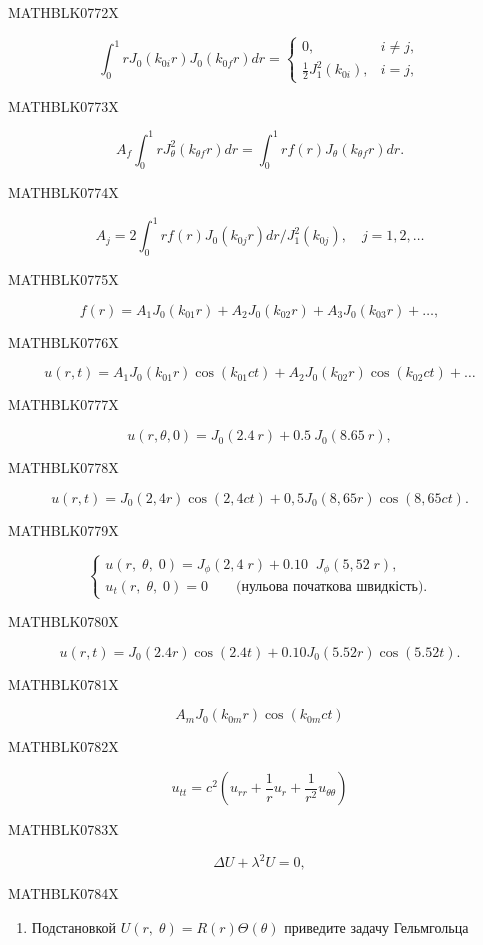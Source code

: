 \documentclass[
  ukrainian,
]{article}
\providecommand{\tightlist}{%
  \setlength{\itemsep}{0pt}\setlength{\parskip}{0pt}}
\begin{document}
MATHBLK0772X

\[
\int_{0}^{1} r J_{0}(k_{0i}r) J_{0}(k_{0f}r) dr = \begin{cases} 0, & i \neq j, \\ \frac{1}{2} J_{1}^{2}(k_{0i}), & i = j, \end{cases}
\]

MATHBLK0773X

\[
A_{f}\int_{0}^{1}rJ_{\theta}^{2}(k_{\theta f}r)dr=\int_{0}^{1}rf(r)J_{\theta}(k_{\theta f}r)dr.
\]

MATHBLK0774X

\[
A_{j} = 2 \int_{0}^{1} r f(r) J_{0}(k_{0j}r) dr / J_{1}^{2}(k_{0j}), \quad j = 1, 2, \dots
\]

MATHBLK0775X

\[
f(r) = A_1 J_0(k_{01}r) + A_2 J_0(k_{02}r) + A_3 J_0(k_{03}r) + \dots,
\]

MATHBLK0776X

\[
u(r, t) = A_1 J_0(k_{01}r) \cos(k_{01}ct) + A_2 J_0(k_{02}r) \cos(k_{02}ct) + \dots
\]

MATHBLK0777X

\[
u(r, \theta, 0) = J_0(2.4 \ r) + 0.5 \ J_0(8.65 \ r),
\]

MATHBLK0778X

\[
u(r, t) = J_0(2, 4 r) \cos(2, 4 ct) + 0,5 J_0(8,65 r) \cos(8,65 ct).
\]

MATHBLK0779X

\[
\begin{cases} u\left(r,\;\theta,\; 0\right) = J_{\phi}\left(2,4\; r\right) + 0.10\;\; J_{\phi}\left(5,52\; r\right),\\ u_{t}\left(r,\;\theta,\; 0\right) = 0 \qquad \text{(нульова початкова швидкість)}. \end{cases}
\]

MATHBLK0780X

\[
u(r, t) = J_0(2.4 r) \cos(2.4 t) + 0.10 J_0(5.52 r) \cos(5.52 t).
\]

MATHBLK0781X

\[
A_m J_0(k_{0m}r)\cos(k_{0m}ct)
\]

MATHBLK0782X

\[
u_{tt} = c^2 \left( u_{rr} + \frac{1}{r} u_r + \frac{1}{r^2} u_{\theta\theta} \right)
\]

MATHBLK0783X

\[
\Delta U + \lambda^2 U = 0,
\]

MATHBLK0784X

\begin{enumerate}
\def\labelenumi{\arabic{enumi}.}
\setcounter{enumi}{1}
\tightlist
\item
  Подстановкой
  \(U\left(r,\;\theta\right)=R\left(r\right)\Theta\left(\theta\right)\)
  приведите задачу Гельмгольца
\end{enumerate}
\end{document}
